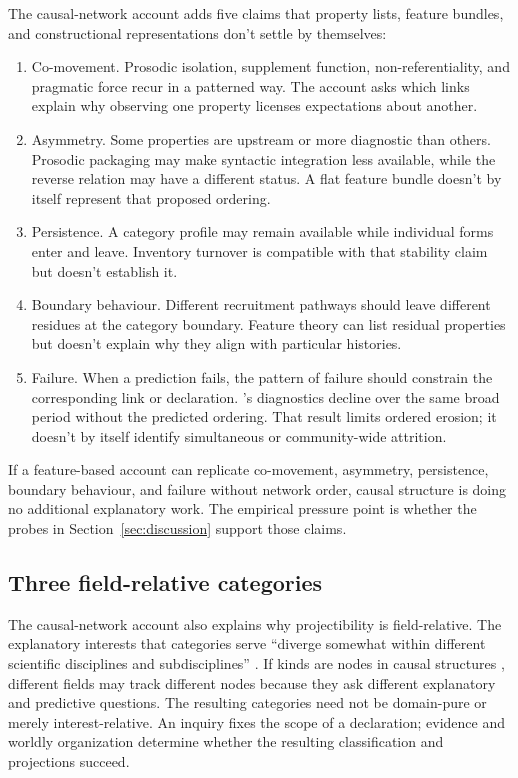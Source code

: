 \documentclass[12pt]{article}
\begin{document}
The causal-network account adds five claims that property lists, feature
bundles, and constructional representations don't settle by themselves:

\begin{enumerate}
\item Co-movement. Prosodic isolation, supplement function,
  non-referentiality, and pragmatic force recur in a patterned way. The
  account asks which links explain why observing one property licenses
  expectations about another.
\item Asymmetry. Some properties are upstream or more diagnostic than
  others. Prosodic packaging may make syntactic integration less
  available, while the reverse relation may have a different status. A flat
  feature bundle doesn't by itself represent that proposed ordering.
\item Persistence. A category profile may remain available while
  individual forms enter and leave. Inventory turnover is compatible with
  that stability claim but doesn't establish it.
\item Boundary behaviour. Different recruitment pathways should leave
  different residues at the category boundary. Feature theory can list
  residual properties but doesn't explain why they align with
  particular histories.
\item Failure. When a prediction fails, the pattern of failure should
  constrain the corresponding link or declaration. 's
  diagnostics decline over the same broad period without the predicted
  ordering. That result limits ordered erosion; it doesn't by itself identify
  simultaneous or community-wide attrition.
\end{enumerate}

If a feature-based account can replicate co-movement, asymmetry,
persistence, boundary behaviour, and failure without network order,
causal structure is doing no additional explanatory work. The empirical
pressure point is whether the probes in Section~\ref{sec:discussion}
support those claims.

\subsection{Three field-relative categories}\label{sec:fieldrelative-nodes}

The causal-network account also explains why projectibility is
field-relative. The explanatory interests that categories serve
\enquote{diverge somewhat within different scientific disciplines and
subdisciplines} \citep[71]{khalidi2013}. If kinds are nodes in causal
structures \citep{khalidi2013,khalidi2018nodes}, different fields may track
different nodes because they ask different explanatory and predictive
questions. The resulting categories
need not be domain-pure or merely interest-relative. An inquiry fixes the
scope of a declaration; evidence and worldly organization determine whether
the resulting classification and projections succeed.
\end{document}
